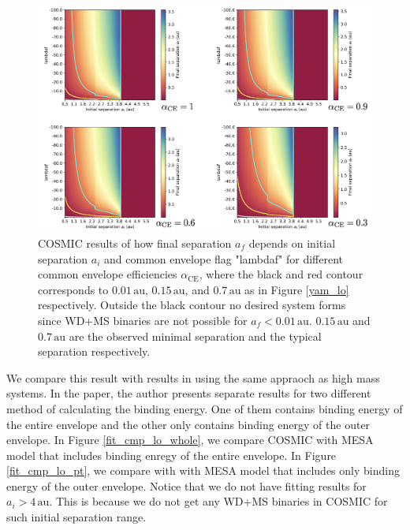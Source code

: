\documentclass[12pt]{article}
\newcommand{\alphace}{\alpha_{\mathrm{CE}}}
\newcommand{\au}{\, \mathrm{au}}
\begin{document}
\begin{figure}
    \centering
    \includegraphics[width=0.9\linewidth]{1.5+0.8results.png}
    \caption{COSMIC results of how final separation $a_f$ depends on initial separation $a_i$ and common envelope flag "lambdaf" for different common envelope efficiencies $\alphace$, where the black and red contour corresponds to $0.01 \au$, $0.15 \au$, and $0.7 \au$ as in Figure \ref{yam_lo} respectively. Outside the black contour no desired system forms since WD+MS binaries are not possible for $a_f < 0.01\au$. $0.15\au$ and $0.7\au$ are the observed minimal separation and the typical separation respectively.}
    \label{res_lo}
\end{figure}

We compare this result with results in \cite{yamaguchi_lo} using the same appraoch as high mass systems. In the paper, the author presents separate results for two different method of calculating the binding energy. One of them contains binding energy of the entire envelope and the other only contains binding energy of the outer envelope. In Figure \ref{fit_cmp_lo_whole}, we compare COSMIC with MESA model that includes binding enregy of the entire envelope. In Figure \ref{fit_cmp_lo_pt}, we compare with with MESA model that includes only binding energy of the outer envelope. Notice that we do not have fitting results for $a_i > 4 \au$. This is because we do not get any WD+MS binaries in COSMIC for such initial separation range.
\end{document}
